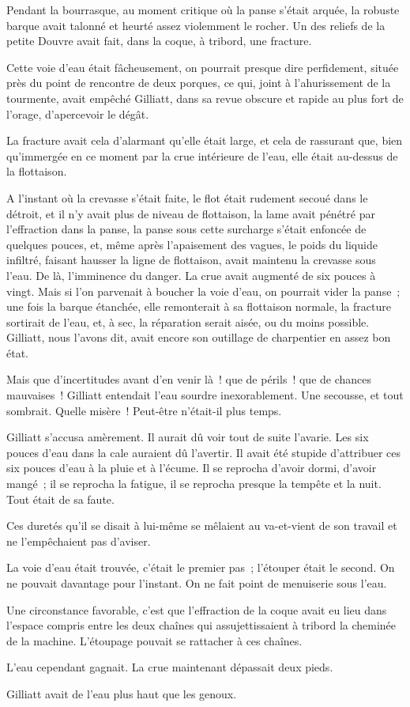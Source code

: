 \documentclass[french,twoside]{book} %
\begin{document}
Pendant la bourrasque, au moment critique où la panse s’était arquée, la robuste barque avait talonné et heurté assez violemment le rocher. Un des reliefs de la petite Douvre avait fait, dans la coque, à tribord, une fracture.\par
Cette voie d’eau était fâcheusement, on pourrait presque dire perfidement, située près du point de rencontre de deux porques, ce qui, joint à l’ahurissement de la tourmente, avait empêché Gilliatt, dans sa revue obscure et rapide au plus fort de l’orage, d’apercevoir le dégât.\par
La fracture avait cela d’alarmant qu’elle était large,  et cela de rassurant que, bien qu’immergée en ce moment par la crue intérieure de l’eau, elle était au-dessus de la flottaison.\par
A l’instant où la crevasse s’était faite, le flot était rudement secoué dans le détroit, et il n’y avait plus de niveau de flottaison, la lame avait pénétré par l’effraction dans la panse, la panse sous cette surcharge s’était enfoncée de quelques pouces, et, même après l’apaisement des vagues, le poids du liquide infiltré, faisant hausser la ligne de flottaison, avait maintenu la crevasse sous l’eau. De là, l’imminence du danger. La crue avait augmenté de six pouces à vingt. Mais si l’on parvenait à boucher la voie d’eau, on pourrait vider la panse ; une fois la barque étanchée, elle remonterait à sa flottaison normale, la fracture sortirait de l’eau, et, à sec, la réparation serait aisée, ou du moins possible. Gilliatt, nous l’avons dit, avait encore son outillage de charpentier en assez bon état.\par
Mais que d’incertitudes avant d’en venir là ! que de périls ! que de chances mauvaises ! Gilliatt entendait l’eau sourdre inexorablement. Une secousse, et tout sombrait. Quelle misère ! Peut-être n’était-il plus temps.\par
Gilliatt s’accusa amèrement. Il aurait dû voir tout de suite l’avarie. Les six pouces d’eau dans la cale auraient dû l’avertir. Il avait été stupide d’attribuer ces six pouces d’eau à la pluie et à l’écume. Il se reprocha d’avoir dormi, d’avoir mangé ; il se reprocha la fatigue, il se reprocha presque la tempête et la nuit. Tout était de sa faute.\par
 Ces duretés qu’il se disait à lui-même se mêlaient au va-et-vient de son travail et ne l’empêchaient pas d’aviser.\par
La voie d’eau était trouvée, c’était le premier pas ; l’étouper était le second. On ne pouvait davantage pour l’instant. On ne fait point de menuiserie sous l’eau.\par
Une circonstance favorable, c’est que l’effraction de la coque avait eu lieu dans l’espace compris entre les deux chaînes qui assujettissaient à tribord la cheminée de la machine. L’étoupage pouvait se rattacher à ces chaînes.\par
L’eau cependant gagnait. La crue maintenant dépassait deux pieds.\par
Gilliatt avait de l’eau plus haut que les genoux.
\end{document}
